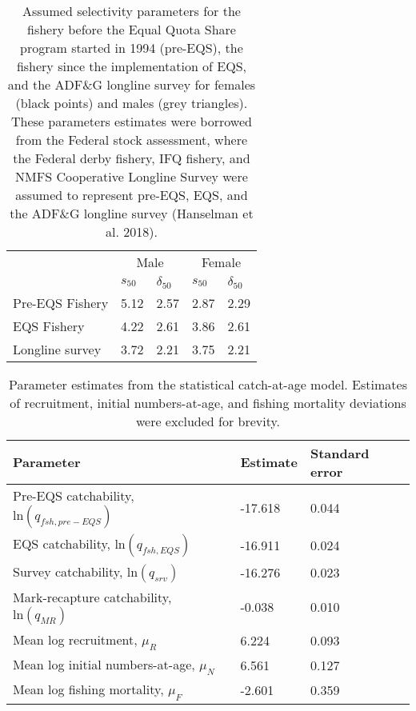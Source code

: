 \documentclass[]{article}
\begin{document}
\begin{table}

\caption{\label{tab:fedsel}Assumed selectivity parameters for the fishery before the Equal Quota Share program started in 1994 (pre-EQS), the fishery since the implementation of EQS, and the ADF\&G longline survey for females (black points) and males (grey triangles). These parameters estimates were borrowed from the Federal stock assessment, where the Federal derby fishery, IFQ fishery, and NMFS Cooperative Longline Survey were assumed to represent pre-EQS, EQS, and the ADF\&G longline survey (Hanselman et al. 2018).}
\centering
\begin{tabular}[t]{lllll}
\toprule
\multicolumn{1}{c}{ } & \multicolumn{2}{c}{Male} & \multicolumn{2}{c}{Female} \\
\cmidrule(l{2pt}r{2pt}){2-3} \cmidrule(l{2pt}r{2pt}){4-5}
 & $s_{50}$ & $\delta_{50}$ & $s_{50}$ & $\delta_{50}$\\
\midrule
Pre-EQS Fishery & 5.12 & 2.57 & 2.87 & 2.29\\
EQS Fishery & 4.22 & 2.61 & 3.86 & 2.61\\
Longline survey & 3.72 & 2.21 & 3.75 & 2.21\\
\bottomrule
\end{tabular}
\end{table}

\begin{table}

\caption{\label{tab:keyparams}Parameter estimates from the statistical catch-at-age model. Estimates of recruitment, initial numbers-at-age, and fishing mortality deviations were excluded for brevity.}
\centering
\begin{tabular}[t]{lll}
\toprule
Parameter & Estimate & Standard error\\
\midrule
Pre-EQS catchability, $\mbox{ln}(q_{fsh,pre-EQS})$ & -17.618 & 0.044\\
EQS catchability, $\mbox{ln}(q_{fsh,EQS})$ & -16.911 & 0.024\\
Survey catchability, $\mbox{ln}(q_{srv})$ & -16.276 & 0.023\\
Mark-recapture catchability, $\mbox{ln}(q_{MR})$ & -0.038 & 0.010\\
Mean log recruitment, $\mu_R$ & 6.224 & 0.093\\
\addlinespace
Mean log initial numbers-at-age, $\mu_N$ & 6.561 & 0.127\\
Mean log fishing mortality, $\mu_F$ & -2.601 & 0.359\\
\bottomrule
\end{tabular}
\end{table}
\end{document}
